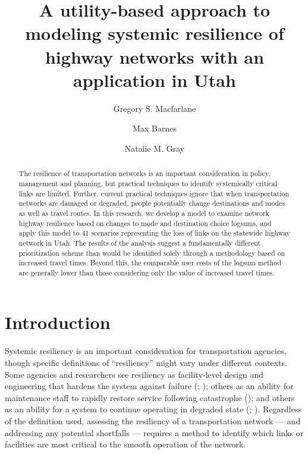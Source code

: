 \documentclass[]{ascelike-new}
\title{A utility-based approach to modeling systemic resilience of
highway networks with an application in Utah}
\author[1*]{Gregory S. Macfarlane}%
\affil[1*]{
	Brigham Young University, Civil and Construction Engineering
Department; 
	Email: gregmacfarlane@byu.edu
	; Corresponding author}
\author[2]{Max Barnes}%
\affil[2]{
	Kimley-Horn; 
	Email: maxbarnes@kha.com
	}
\author[3]{Natalie M. Gray}%
\affil[3]{
	WSP; 
	Email: nat.gray2000@gmail.com
	}
\begin{document}
\maketitle

\begin{abstract}
	The resilience of transportation networks is an important consideration
in policy, management and planning, but practical techniques to identify
systemically critical links are limited. Further, current practical
techniques ignore that when transportation networks are damaged or
degraded, people potentially change destinations and modes as well as
travel routes. In this research, we develop a model to examine network
highway resilience based on changes to mode and destination choice
logsums, and apply this model to 41 scenarios representing the loss of
links on the statewide highway network in Utah. The results of the
analysis suggest a fundamentally different prioritization scheme than
would be identified solely through a methodology based on increased
travel times. Beyond this, the comparable user costs of the logsum
method are generally lower than those considering only the value of
increased travel times.
\end{abstract}

\par
\vspace{1em}


\section{Introduction}\label{intro}

Systemic resiliency is an important consideration for transportation
agencies, though specific definitions of ``resiliency'' might vary under
different contexts. Some agencies and researchers see resiliency as
facility-level design and engineering that hardens the system against
failure (;
); others as an ability for
maintenance staff to rapidly restore service following catastrophe
(); and others as an
ability for a system to continue operating in degraded state
(; ). Regardless of the definition used, assessing the resiliency
of a transportation network --- and addressing any potential shortfalls
--- requires a method to identify which links or facilities are most
critical to the smooth operation of the network.
\end{document}
